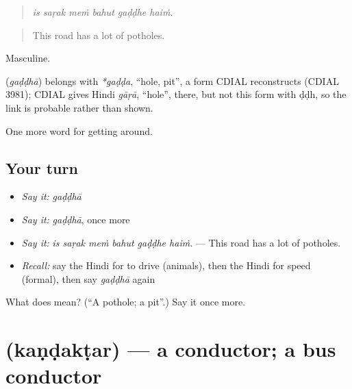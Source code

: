 \begin{quote}
     
\end{quote}

\begin{quote}
\emph{is saṛak meṁ bahut gaḍḍhe haiṁ.}
\end{quote}

\begin{quote}
This road has a lot of potholes.
\end{quote}

Masculine.

\begin{cousinweb}
\textbf{} (\emph{gaḍḍhā}) belongs with \emph{*gaḍḍa}, \textquotedblleft{}hole, pit\textquotedblright{}, a form CDIAL reconstructs (CDIAL 3981); CDIAL gives Hindi \emph{gāṛā}, \textquotedblleft{}hole\textquotedblright{}, there, but not this form with ḍḍh, so the link is probable rather than shown.
\end{cousinweb}

\begin{grammarlens}[title={What you've built}]
One more word for getting around.
\end{grammarlens}

\subsection*{Your turn}
\begin{itemize}
\raggedright
  \item \emph{Say it:} \emph{gaḍḍhā}
  \item \emph{Say it:} \emph{gaḍḍhā}, once more
  \item \emph{Say it:} \emph{is saṛak meṁ bahut gaḍḍhe haiṁ.} — This road has a lot of potholes.
  \item \emph{Recall:} say the Hindi for to drive (animals), then the Hindi for speed (formal), then say \emph{gaḍḍhā} again
\end{itemize}

\begin{tcolorbox}[breakable,colback=teal!4,colframe=teal!35!black,title={Before you move on}]
What does  mean? (\textquotedblleft{}A pothole; a pit\textquotedblright{}.) Say it once more.
\end{tcolorbox}
\section[\texorpdfstring{\hi{कंडक्टर} (kaṇḍakṭar)}{कंडक्टर (kaṇḍakṭar)}]{ (kaṇḍakṭar) — a conductor; a bus conductor}

